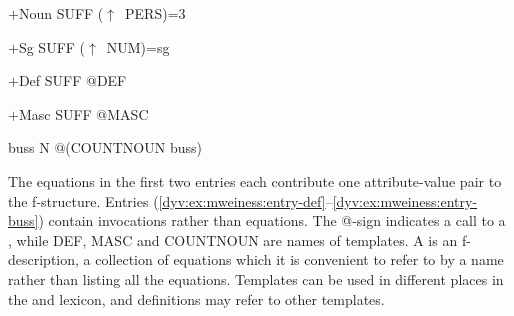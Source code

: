 \documentclass[output=paper]{langsci/langscibook}
\begin{document}
\ea\label{dyv:ex:mweiness:entry-noun}
{\small 
$+$Noun \hspace{0.4em} SUFF \hspace{0.4em} ($\uparrow$~PERS)=3
}
\z

\ea\label{dyv:ex:mweiness:entry-sg}
{\small 
$+$Sg \hspace{1.7em} SUFF \hspace{0.4em} ($\uparrow$~NUM)=sg
}
\z

\ea\label{dyv:ex:mweiness:entry-def}
{\small 
$+$Def  \hspace{1.2em} SUFF \hspace{0.4em} @DEF
}
\z

\ea\label{dyv:ex:mweiness:entry-masc}
{\small 
$+$Masc  \hspace{0.6em} SUFF \hspace{0.4em} @MASC
}
\z


\ea\label{dyv:ex:mweiness:entry-buss}
{\small 
buss  \hspace{1.5em} N \hspace{1.8em} @(COUNTNOUN buss)
}
\z


The equations in the first two entries each contribute one attribute-value pair to the f-structure.
Entries (\ref{dyv:ex:mweiness:entry-def}--\ref{dyv:ex:mweiness:entry-buss}) contain  invocations rather than equations.
The @-sign indicates a call to a , while DEF, MASC and COUNTNOUN are names of templates.
A  is an f-description, a collection of equations which it is convenient to refer to by a name rather than listing all the equations.
Templates can be used in different places in the  and lexicon, and  definitions may refer to other templates.
\end{document}
